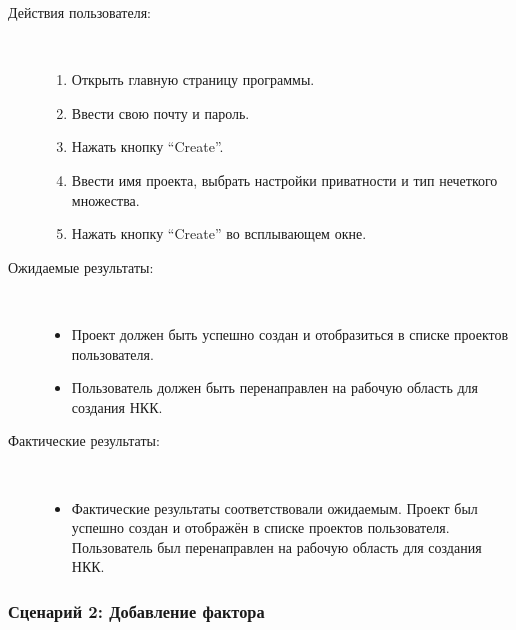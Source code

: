 \documentclass{article}
\begin{document}
    \begin{description}
        \item [Действия пользователя:]\\
        \begin{enumerate}
            \item Открыть главную страницу программы.
            \item Ввести свою почту и пароль.
            \item Нажать кнопку ``Create''.
            \item Ввести имя проекта, выбрать настройки приватности и тип нечеткого множества.
            \item Нажать кнопку ``Create'' во всплывающем окне.
        \end{enumerate}
        \item [Ожидаемые результаты:]\\
        \begin{itemize}
            \item Проект должен быть успешно создан и отобразиться в списке проектов пользователя.
            \item Пользователь должен быть перенаправлен на рабочую область для создания НКК.
        \end{itemize}
        \item [Фактические результаты:] \\
        \begin{itemize}
            \item Фактические результаты соответствовали ожидаемым. Проект был успешно создан и отображён в списке проектов пользователя. Пользователь был перенаправлен на рабочую область для создания НКК.
        \end{itemize}
    \end{description}

    \subsubsection{Сценарий 2: Добавление фактора}
\end{document}
